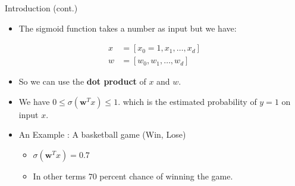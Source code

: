 \documentclass[serif, aspectratio=169]{beamer}
\begin{document}

    \begin{frame}{Introduction (cont.)}
        \begin{itemize}
            \item The sigmoid function takes a number as input but we have:
        \end{itemize}
        \begin{align*}
            x &= [x_0=1,x_1, \dots, x_d] \\
            w &= [w_0, w_1, \dots, w_d]
        \end{align*}
        \begin{itemize}
            \item So we can use the \textbf{dot product} of $x$ and $w$.

            \item We have $0\leq \sigma (\mathbf{w}^Tx) \leq 1$. which is the estimated probability of $y=1$ on input $x$.

            \item An Example : A basketball game (Win, Lose)
            \begin{itemize}
                \item $\sigma (\mathbf{w}^T x) = 0.7$
                \item In other terms $70$ percent chance of winning the game.
            \end{itemize}

        \end{itemize}
    \end{frame}
\end{document}
